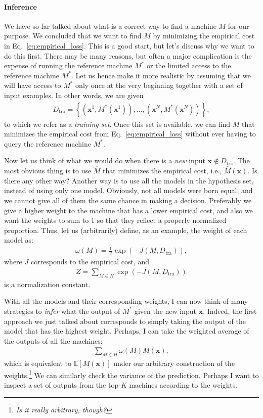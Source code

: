 \documentclass{report}
\newcommand{\vect}[1]{\mathbf{#1}}
\newcommand{\vx}[0]{\vect{x}}
\begin{document}
\paragraph{Inference}

We have so far talked about what is a correct way to find a machine $M$ for our
purpose. We concluded that we want to find $M$ by minimizing the empirical cost
in Eq.~\eqref{eq:empirical_loss}. This is a good start, but let's discuss why we
want to do this first. There may be many reasons, but often a major complication
is the expense of running the reference machine $M^*$ or the limited access to
the reference machine $M^*$. Let us hence make it more realistic by assuming
that we will have access to $M^*$ only once at the very beginning together with
a set of input examples. In other words, we are given
\begin{align*}
    D_{\text{tra}} = \left\{ (\vx^1, M^*(\vx^1)), \ldots, (\vx^N,
    M^*(\vx^N))\right\},
\end{align*}
to which we refer as a {\it training set}. Once this set is available, we can
find $M$ that minimizes the empirical cost from Eq.~\eqref{eq:empirical_loss}
without ever having to query the reference machine $M^*$. 

Now let us think of what we would do when there is a {\it new} input $\vx \notin
D_{\text{tra}}$. The most obvious thing is to use $\hat{M}$ that minimizes the
empirical cost, i.e., $\hat{M}(\vx)$. Is there any other way? Another way is to
use all the models in the hypothesis set, instead of using only one model.
Obviously, not all models were born equal, and we cannot give all of them the
same chance in making a decision. Preferably we give a higher weight to the
machine that has a lower empirical cost, and also we want the weights to sum to
1 so that they reflect a properly normalized proportion. Thus, let us
(arbitrarily) define, as an example, the weight of each model as:
\begin{align*}
    \omega(M) = \frac{1}{Z} \exp\left( -J(M, D_{\text{tra}} ) \right),
\end{align*}
where $J$ corresponds to the empirical cost, and 
\begin{align*}
    Z = \sum_{M \in H} \exp\left( -J(M, D_{\text{tra}}) \right)
\end{align*}
is a normalization constant. 

With all the models and their corresponding weights, I can now think of many
strategies to {\it infer} what the output of $M^*$ given the new input $\vx$.
Indeed, the first approach we just talked about corresponds to simply taking the
output of the model that has the highest weight. Perhaps, I can take the
weighted average of the outputs of all the machines:
\begin{align}
    \label{eq:bayes0}
    \sum_{M \in H} \omega(M) M(\vx),
\end{align}
which is equivalent to $\mathbb{E}\left[ M(\vx) \right]$ under our arbitrary
construction of the weights.\footnote{
    {\it Is it really arbitrary, though?}
} We can similarly check the variance of the prediction. Perhaps I want to
inspect a set of outputs from the top-$K$ machines according to the weights.
\end{document}
